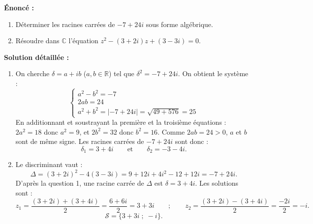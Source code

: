 \documentclass[11pt]{article}
\begin{document}
\begin{corrige}
\textbf{Énoncé :}
\begin{enumerate}
\item Déterminer les racines carrées de $-7+24i$ sous forme algébrique.
\item Résoudre dans $\mathbb{C}$ l'équation $z^2 - (3+2i)z + (3-3i) = 0$.
\end{enumerate}
\tcblower
\textbf{Solution détaillée :}
\begin{enumerate}
\item On cherche $\delta = a+ib$ ($a, b \in \mathbb{R}$) tel que $\delta^2 = -7+24i$. On obtient le système :
\[ \begin{cases} a^2 - b^2 = -7 \\ 2ab = 24 \\ a^2 + b^2 = |-7+24i| = \sqrt{49+576} = 25 \end{cases} \]
En additionnant et soustrayant la première et la troisième équations : $2a^2 = 18$ donc $a^2 = 9$, et $2b^2 = 32$ donc $b^2 = 16$. Comme $2ab = 24 > 0$, $a$ et $b$ sont de même signe. Les racines carrées de $-7+24i$ sont donc :
\[ \delta_1 = 3+4i \qquad \text{et} \qquad \delta_2 = -3-4i. \]
\item Le discriminant vaut :
\[ \Delta = (3+2i)^2 - 4(3-3i) = 9 + 12i + 4i^2 - 12 + 12i = -7 + 24i. \]
D'après la question 1, une racine carrée de $\Delta$ est $\delta = 3+4i$. Les solutions sont :
\[ z_1 = \dfrac{(3+2i) + (3+4i)}{2} = \dfrac{6+6i}{2} = 3+3i \qquad ; \qquad z_2 = \dfrac{(3+2i) - (3+4i)}{2} = \dfrac{-2i}{2} = -i. \]
\[ \mathcal{S} = \{3+3i \; ; \; -i\}. \]
\end{enumerate}
\end{corrige}
\end{document}

